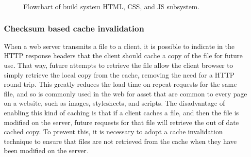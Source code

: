\begin{figure}[H]
\caption[Flowchart of build system HTML, CSS, and JS subsystem]
        {Flowchart of build system HTML, CSS, and JS subsystem.}
\label{fig:build-system-flowchart}
\end{figure}


\subsubsection*{Checksum based cache invalidation}

When a web server transmits a file to a client, it is possible to
indicate in the HTTP response headers that the client should cache a
copy of the file for future use. That way, future attempts to retrieve
the file allow the client browser to simply retrieve the local copy
from the cache, removing the need for a HTTP round trip. This greatly
reduces the load time on repeat requests for the same file, and so is
commonly used in the web for asset that are common to every page on a
website, such as images, stylesheets, and scripts. The disadvantage of
enabling this kind of caching is that if a client caches a file, and
then the file is modified on the server, future requests for that file
will retrieve the out of date cached copy. To prevent this, it is
necessary to adopt a cache invalidation technique to ensure that files
are not retrieved from the cache when they have been modified on the
server.


